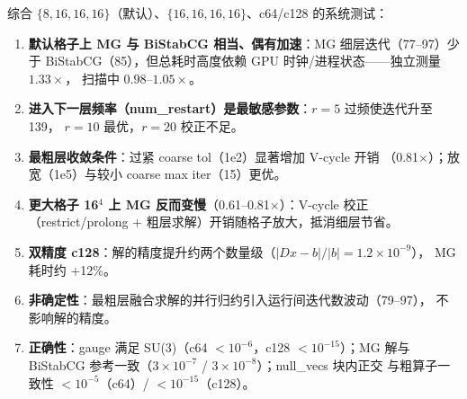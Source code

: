 \documentclass[11pt,a4paper]{article}
\begin{document}
综合 $\{8,16,16,16\}$（默认）、$\{16,16,16,16\}$、c64/c128 的系统测试：
\begin{enumerate}
  \item \textbf{默认格子上 MG 与 BiStabCG 相当、偶有加速}：MG 细层迭代（77--97）少于
        BiStabCG（85），但总耗时高度依赖 GPU 时钟/进程状态——独立测量 $1.33\times$，
        扫描中 $0.98$--$1.05\times$。
  \item \textbf{进入下一层频率（num\_restart）是最敏感参数}：$r=5$ 过频使迭代升至 139，
        $r=10$ 最优，$r=20$ 校正不足。
  \item \textbf{最粗层收敛条件}：过紧 coarse tol（1e2）显著增加 V-cycle 开销
        （0.81$\times$）；放宽（1e5）与较小 coarse max iter（15）更优。
  \item \textbf{更大格子 16$^4$ 上 MG 反而变慢}（0.61--0.81$\times$）：V-cycle 校正
        （restrict/prolong + 粗层求解）开销随格子放大，抵消细层节省。
  \item \textbf{双精度 c128}：解的精度提升约两个数量级（$|Dx-b|/|b|=1.2\times10^{-9}$），
        MG 耗时约 +12\%。
  \item \textbf{非确定性}：最粗层融合求解的并行归约引入运行间迭代数波动（79--97），
        不影响解的精度。
  \item \textbf{正确性}：gauge 满足 SU(3)（c64 $<10^{-6}$，c128 $<10^{-15}$）；MG 解与
        BiStabCG 参考一致（$3\times10^{-7}$ / $3\times10^{-8}$）；null\_vecs 块内正交
        与粗算子一致性 $<10^{-5}$（c64）/ $<10^{-15}$（c128）。
\end{enumerate}
\end{document}
